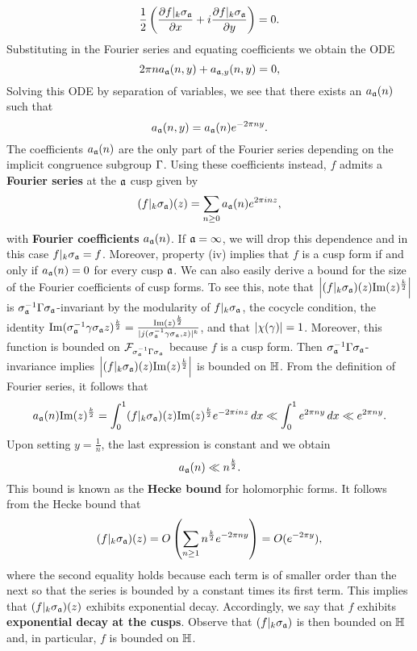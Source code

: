     \[
      \frac{1}{2}\left(\frac{\partial f|_{k}\sigma_{\mathfrak{a}}}{\partial x}+i\frac{\partial f|_{k}\sigma_{\mathfrak{a}}}{\partial y}\right) = 0.
    \]
    Substituting in the Fourier series and equating coefficients we obtain the ODE
    \[
      2\pi na_{\mathfrak{a}}(n,y)+a_{\mathfrak{a},y}(n,y) = 0,
    \]
    Solving this ODE by separation of variables, we see that there exists an $a_{\mathfrak{a}}(n)$ such that
    \[
      a_{\mathfrak{a}}(n,y) = a_{\mathfrak{a}}(n)e^{-2\pi ny}.
    \]
    The coefficients $a_{\mathfrak{a}}(n)$ are the only part of the Fourier series depending on the implicit congruence subgroup $\Gamma$. Using these coefficients instead, $f$ admits a \textbf{Fourier series} at the $\mathfrak{a}$ cusp given by
    \[
      (f|_{k}\sigma_{\mathfrak{a}})(z) = \sum_{n \ge 0}a_{\mathfrak{a}}(n)e^{2\pi inz},
    \]
    with \textbf{Fourier coefficients} $a_{\mathfrak{a}}(n)$. If $\mathfrak{a} = \infty$, we will drop this dependence and in this case $f|_{k}\sigma_{\mathfrak{a}} = f$. Moreover, property (iv) implies that $f$ is a cusp form if and only if $a_{\mathfrak{a}}(n) = 0$ for every cusp $\mathfrak{a}$. We can also easily derive a bound for the size of the Fourier coefficients of cusp forms. To see this, note that $\left|(f|_{k}\sigma_{\mathfrak{a}})(z)\mathrm{Im}(z)^{\frac{k}{2}}\right|$ is $\sigma_{\mathfrak{a}}^{-1}\Gamma\sigma_{\mathfrak{a}}$-invariant by the modularity of $f|_{k}\sigma_{\mathfrak{a}}$, the cocycle condition, the identity $\mathrm{Im}(\sigma_{\mathfrak{a}}^{-1}\gamma\sigma_{\mathfrak{a}}z)^{\frac{k}{2}} = \frac{\mathrm{Im}(z)^{\frac{k}{2}}}{|j(\sigma_{\mathfrak{a}}^{-1}\gamma\sigma_{\mathfrak{a}},z)|^{k}}$, and that $|\chi(\gamma)| = 1$. Moreover, this function is bounded on $\mathcal{F}_{\sigma_{\mathfrak{a}}^{-1}\Gamma\sigma_{\mathfrak{a}}}$ because $f$ is a cusp form. Then $\sigma_{\mathfrak{a}}^{-1}\Gamma\sigma_{\mathfrak{a}}$-invariance implies $\left|(f|_{k}\sigma_{\mathfrak{a}})(z)\mathrm{Im}(z)^{\frac{k}{2}}\right|$ is bounded on $\mathbb{H}$. From the definition of Fourier series, it follows that
    \[
      a_{\mathfrak{a}}(n)\mathrm{Im}(z)^{\frac{k}{2}} = \int_{0}^{1}(f|_{k}\sigma_{\mathfrak{a}})(z)\mathrm{Im}(z)^{\frac{k}{2}}e^{-2\pi inz}\,dx \ll \int_{0}^{1}e^{2\pi ny}\,dx \ll e^{2\pi ny}.
    \]
    Upon setting $y = \frac{1}{n}$, the last expression is constant and we obtain
    \[
      a_{\mathfrak{a}}(n) \ll n^{\frac{k}{2}}.
    \]
    This bound is known as the \textbf{Hecke bound} for holomorphic forms. It follows from the Hecke bound that
    \[
      (f|_{k}\sigma_{\mathfrak{a}})(z) = O\left(\sum_{n \ge 1}n^{\frac{k}{2}}e^{-2\pi ny}\right) = O(e^{-2\pi y}),
    \]
     where the second equality holds because each term is of smaller order than the next so that the series is bounded by a constant times its first term. This implies that $(f|_{k}\sigma_{\mathfrak{a}})(z)$ exhibits exponential decay. Accordingly, we say that $f$ exhibits \textbf{exponential decay at the cusps}. Observe that $(f|_{k}\sigma_{\mathfrak{a}})$ is then bounded on $\mathbb{H}$ and, in particular, $f$ is bounded on $\mathbb{H}$.
